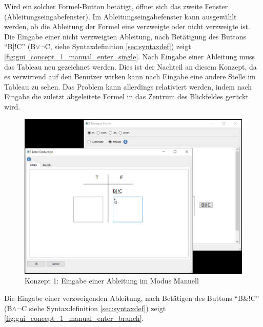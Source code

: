 Wird ein solcher Formel-Button betätigt, öffnet sich das zweite Fenster (Ableitungseingabefenster). Im Ableitungseingabefenster kann ausgewählt werden, ob die Ableitung der Formel eine verzweigte oder nicht verzweigte ist. Die Eingabe einer nicht verzweigten Ableitung, nach Betätigung des Buttons \enquote{B|!C} (B$\vee\neg$C, siehe Syntaxdefinition \autoref{sec:syntaxdef}) zeigt \autoref{fig:gui_concept_1_manual_enter_single}. Nach Eingabe einer Ableitung muss das Tableau neu gezeichnet werden. Dies ist der Nachteil an diesem Konzept, da es verwirrend auf den Benutzer wirken kann nach Eingabe eine andere Stelle im Tableau zu sehen. Das Problem kann allerdings relativiert werden, indem nach Eingabe die zuletzt abgeleitete Formel in das Zentrum des Blickfeldes gerückt wird.

\begin{figure}[H]
\begin{center}
\includegraphics[scale=0.7]{images/gui_concept_1_manual_enter_single.png}
\caption{Konzept 1: Eingabe einer Ableitung im Modus Manuell}
\label{fig:gui_concept_1_manual_enter_single}
\end{center}
\end{figure}

Die Eingabe einer verzweigenden Ableitung, nach Betätigen des Buttons \enquote{B\&!C} (B$\wedge\neg$C siehe Syntaxdefinition \autoref{sec:syntaxdef}) zeigt \autoref{fig:gui_concept_1_manual_enter_branch}.

